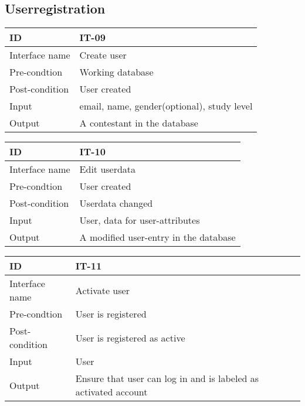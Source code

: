 \subsection{Userregistration}

\begin{center}
\begin{tabular}{|l|p{}|}
\hline
ID & IT-09\\\hline
Interface name & Create user\\\hline
Pre-condtion & Working database\\\hline
Post-condition & User created\\\hline
Input & email, name, gender(optional), study level\\\hline
Output & A contestant in the database\\\hline
\end{tabular}
\end{center}

\begin{center}
\begin{tabular}{|l|p{}|}
\hline
ID & IT-10\\\hline
Interface name & Edit userdata\\\hline
Pre-condtion & User created\\\hline
Post-condition & Userdata changed\\\hline
Input & User, data for user-attributes\\\hline
Output & A modified user-entry in the database\\\hline
\end{tabular}
\end{center}

\begin{center}
\begin{tabular}{|l|p{}|}
\hline
ID & IT-11\\\hline
Interface name & Activate user\\\hline
Pre-condtion & User is registered\\\hline
Post-condition & User is registered as active\\\hline
Input & User\\\hline
Output & Ensure that user can log in and is labeled as activated
account\\\hline
\end{tabular}
\end{center}

